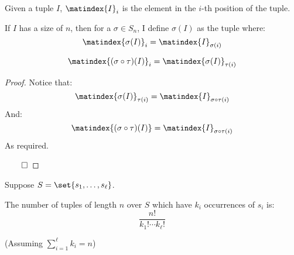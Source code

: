 \begin{defn*}

	Given a tuple $I$, $\matindex{I}_i$ is the element in the $i$-th position of the tuple.

	If $I$ has a size of $n$, then for a $\sigma\in S_n$, I define $\sigma(I)$ as the tuple where:
	\[ \matindex{\sigma(I)}_i = \matindex{I}_{\sigma(i)} \]

\end{defn*}

\begin{lemm*}

	\[ \matindex{(\sigma\circ\tau)(I)}_i = \matindex{\sigma(I)}_{\tau(i)} \]

\end{lemm*}

\begin{proof}

	Notice that:
	\[ \matindex{\sigma(I)}_{\tau(i)} = \matindex{I}_{\sigma\circ\tau(i)} \]
	And:
	\[ \matindex{(\sigma\circ\tau)(I)} = \matindex{I}_{\sigma\circ\tau(i)} \]
	As required.

\hfill$\qed$

\end{proof}

\begin{lemm*}[multinomialLemma]

	Suppose $S=\set{s_1,\dots,s_\ell}$.

	The number of tuples of length $n$ over $S$ which have $k_i$ occurrences of $s_i$ is:
	\[ \frac{n!}{k_1!\cdots k_\ell!} \]

	(Assuming $\sum\limits_{i=1}^\ell k_i = n$)

\end{lemm*}

